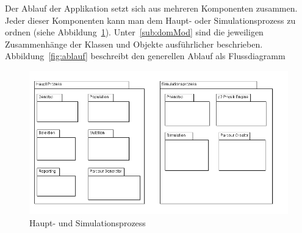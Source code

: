     Der Ablauf der Applikation setzt sich aus mehreren Komponenten zusammen.
    Jeder dieser Komponenten kann man dem Haupt- oder Simulationsprozess zu ordnen (siehe Abbildung~\ref{fig:hauptSimuProzesse}).
    Unter~\ref{sub:domMod} sind die jeweiligen Zusammenhänge der Klassen und Objekte ausführlicher beschrieben.
    Abbildung~\ref{fig:ablauf} beschreibt den generellen Ablauf als Flussdiagramm
    \begin{figure}[H]
      \includegraphics[scale=0.45]{graphics/haupt_simulations_prozess}
      \caption{Haupt- und Simulationsprozess\label{fig:hauptSimuProzesse}}
    \end{figure}
